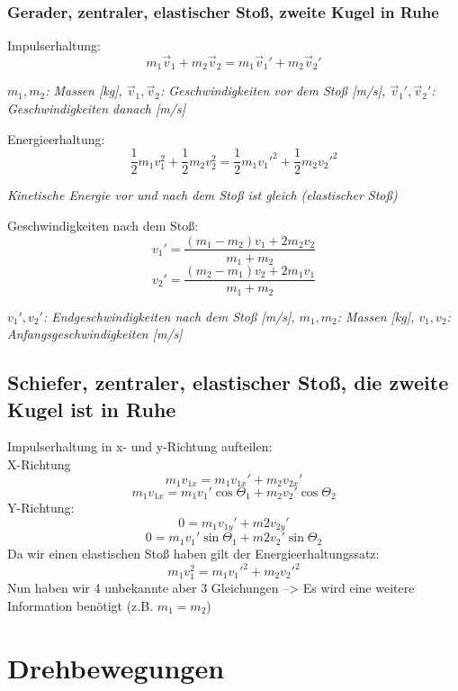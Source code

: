 \documentclass[a4paper,10pt]{article}
\newenvironment{displayformula}
{
	\begin{framed}
		\color{formulaColor}
	}
	{\end{framed}}
\newcommand{\formulalegend}[1]{%
	\par\vspace{0.5ex}%
	{{\color{legendColor}\RaggedRight\small\textit{#1}}}%
	\par\vspace{1.5ex}%
}
\begin{document}
\subsubsection{Gerader, zentraler, elastischer Stoß, zweite Kugel in Ruhe}

\begin{displayformula}
	Impulserhaltung:
	\[
	m_1 \vec{v}_1 + m_2 \vec{v}_2 = m_1 \vec{v}_1' + m_2 \vec{v}_2'
	\]
\end{displayformula}
\formulalegend{
	\( m_1, m_2 \): Massen [kg], \( \vec{v}_1, \vec{v}_2 \): Geschwindigkeiten vor dem Stoß [m/s], \( \vec{v}_1', \vec{v}_2' \): Geschwindigkeiten danach [m/s]
}

\begin{displayformula}
	Energieerhaltung:
	\[
	\frac{1}{2} m_1 v_1^2 + \frac{1}{2} m_2 v_2^2 = \frac{1}{2} m_1 {v_1'}^2 + \frac{1}{2} m_2 {v_2'}^2
	\]
\end{displayformula}
\formulalegend{
	Kinetische Energie vor und nach dem Stoß ist gleich (elastischer Stoß)
}

\begin{displayformula}
	Geschwindigkeiten nach dem Stoß:
	\[
	v_1' = \frac{(m_1 - m_2) v_1 + 2 m_2 v_2}{m_1 + m_2}
	\]
	\[
	v_2' = \frac{(m_2 - m_1) v_2 + 2 m_1 v_1}{m_1 + m_2}
	\]
\end{displayformula}
\formulalegend{
	\( v_1', v_2' \): Endgeschwindigkeiten nach dem Stoß [m/s], \( m_1, m_2 \): Massen [kg], \( v_1, v_2 \): Anfangsgeschwindigkeiten [m/s]
}

\subsection{Schiefer, zentraler, elastischer Stoß, die zweite Kugel ist in Ruhe}

\begin{displayformula}
	Impulserhaltung in x- und y-Richtung aufteilen: \\
	X-Richtung
	\[
	m_1v_{1x} = m_1v_{1x}' + m_2v_{2x}'
	\]
	\[
	m_1v_{1x} = m_1v_1' \cos \Theta_1 + m_2v_2' \cos \Theta_2
	\]
	Y-Richtung:
	\[
	0 = m_1v_{1y}' + m2v_{2y}'
	\]
	\[
	0 = m_1v_1' \sin \Theta_1  + m2v_2' \sin \Theta_2
	\]
	Da wir einen elastischen Stoß haben gilt der Energieerhaltungssatz:
	\[
		m_1 v_1^2 = m_1 v_1'^2 +  m_2 v_2'^2
	\]
	Nun haben wir 4 unbekannte aber 3 Gleichungen --> Es wird eine weitere Information benötigt (z.B. $m_1 = m_2$)
\end{displayformula}

\section{Drehbewegungen}
\end{document}
